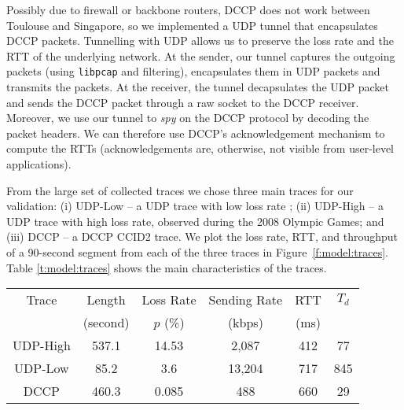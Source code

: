 Possibly due to firewall or backbone routers, DCCP does not work between Toulouse and Singapore,
so we implemented a UDP tunnel that encapsulates
DCCP packets.
%
Tunnelling with UDP 
allows us to preserve the loss rate and the RTT of the underlying network.
At the sender, our tunnel captures the outgoing packets (using \texttt{libpcap} and filtering),
encapsulates them in UDP packets and transmits the packets.  At the receiver, 
the tunnel decapsulates the UDP packet and sends the DCCP packet through a raw socket
to the DCCP receiver.  %
    Moreover, we use our tunnel to \emph{spy} on the DCCP protocol by decoding
    the packet headers. We can therefore use DCCP's acknowledgement
    mechanism to compute the RTTs (acknowledgements are,
    otherwise, not visible from user-level applications).

    From the large set of collected traces we chose three main traces for our validation:
 (i) \textsf{UDP-Low} -- a UDP trace with low loss rate ;
(ii) \textsf{UDP-High} --  a UDP trace with high loss rate, observed during the 2008 Olympic Games; and 
(iii) \textsf{DCCP} -- a DCCP CCID2 trace. We plot the loss rate, RTT, and throughput of a 90-second segment from each of the three traces in Figure~\ref{f:model:traces}.  
Table \ref{t:model:traces} shows the main characteristics of the traces.

\begin{table*}[htb!]
\centering
\begin{tabular}{|c|c|c|c|c|c|}
\hline
Trace    & Length  & Loss Rate& Sending Rate & RTT & $T_d$\\
         & (second)&     $p$ (\%)         &   (kbps)              & (ms) & \\
\hline
\textsf{UDP-High} &  537.1  &  14.53    &  2,087 & 412 & 77\\
\textsf{UDP-Low}  &  85.2   &  3.6      & 13,204 & 717 & 845\\
\textsf{DCCP}     &  460.3  &  0.085    &    488 & 660 & 29\\
\hline
\end{tabular}
\caption{Main characteristics of the transmission traces.}
\label{t:model:traces}
\end{table*}

